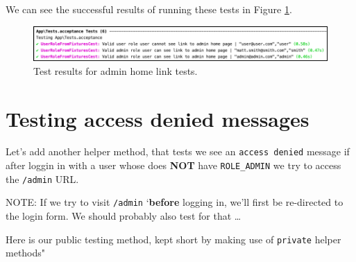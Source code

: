 \documentclass[a4paperpaper,openright]{book}
\newenvironment{Shaded}{}{}
\newcommand{\AnnotationTok}[1]{\textcolor[rgb]{0.38,0.63,0.69}{\textbf{\textit{#1}}}}
\newcommand{\CommentTok}[1]{\textcolor[rgb]{0.38,0.63,0.69}{\textit{#1}}}
\newcommand{\CommentVarTok}[1]{\textcolor[rgb]{0.38,0.63,0.69}{\textbf{\textit{#1}}}}
\newcommand{\KeywordTok}[1]{\textcolor[rgb]{0.00,0.44,0.13}{\textbf{#1}}}
\newcommand{\NormalTok}[1]{#1}
\newcommand{\OtherTok}[1]{\textcolor[rgb]{0.00,0.44,0.13}{#1}}
\newcommand{\StringTok}[1]{\textcolor[rgb]{0.25,0.44,0.63}{#1}}
\begin{document}
We can see the successful results of running these tests in Figure
\ref{linkTests}.

\begin{figure}
\centering
\includegraphics{./tex2pdf.-8aed53dcd332a606/5fd12dfb913b1a7298d322573cd58c01f6026a1e.png}
\caption{Test results for admin home link tests.\label{linkTests}}
\end{figure}

\hypertarget{testing-access-denied-messages}{%
\section{Testing access denied
messages}\label{testing-access-denied-messages}}

Let's add another helper method, that tests we see an
\texttt{access\ denied} message if after loggin in with a user whose
does \textbf{NOT} have \texttt{ROLE\_ADMIN} we try to access the
\texttt{/admin} URL.

NOTE: If we try to visit \texttt{/admin} `\textbf{before} logging in,
we'll first be re-directed to the login form. We should probably also
test for that \ldots{}

Here is our public testing method, kept short by making use of
\texttt{private} helper methods"

\begin{Shaded}
\end{Shaded}
\end{document}

